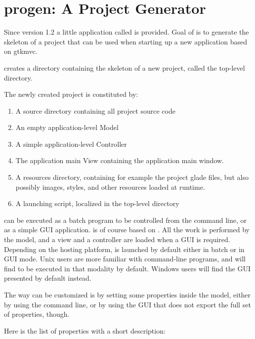 \section{progen: A Project Generator}
\label{PROGEN}

Since version 1.2 a little application called 
is provided. Goal of  is to generate the skeleton
of a project that can be used when starting up a new application
based on gtkmvc.

 creates a directory containing the skeleton of a
new project, called the top-level directory.

The newly created project is constituted by:
\begin{enumerate}
\item A source directory containing all project source code
\item An empty application-level Model
\item A simple application-level Controller
\item The application main View containing the application main window. 
\item A resources directory, containing for example the project
  glade files, but also possibly images, styles, and other resources
  loaded at runtime.
\item A launching script, localized in the top-level directory
\end{enumerate}


 can be executed as a batch program to be
controlled from the command line, or as a simple GUI
application.  is of course based on \pygtkmvc. All
the work is performed by the model, and a view and a controller are
loaded when a GUI is required. Depending on the hosting platform,
 is launched by default either in batch or in GUI
mode. Unix users are more familiar with command-line programs, and
will find  to be executed in that modality by
default. Windows users will find the GUI presented by default
instead.

The way  can be customized is by setting some
properties inside the model, either by using the command line, or by
using the GUI that does not export the full set of properties,
though.

Here is the list of properties with a short description:

